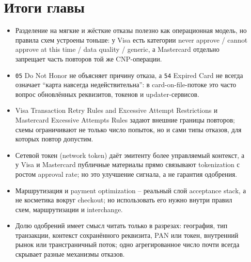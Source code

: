 \section*{Итоги главы}
\begin{itemize}
  \item Разделение на мягкие и жёсткие отказы полезно как операционная
        модель, но правила схем устроены тоньше: у Visa есть
        категории never approve / cannot approve at this time / data
        quality / generic, а Mastercard отдельно запрещает часть
        повторов той же CNP-операции.
  \item \texttt{05} Do Not Honor не объясняет причину отказа, а \texttt{54}
        Expired Card не всегда означает \enquote{карта навсегда
        недействительна}: в card-on-file-потоке это часто вопрос
        обновлённых реквизитов, токенов и updater-сервисов.
  \item Visa Transaction Retry Rules and Excessive Attempt Restrictions
        и Mastercard Excessive Attempts Rules задают внешние границы
        повторов; схемы ограничивают не только число попыток, но и сами
        типы отказов, для которых повтор допустим.
  \item Сетевой токен (network token) даёт эмитенту более управляемый
        контекст, а у Visa и Mastercard публичные
        материалы прямо связывают tokenization с ростом approval rate;
        но это улучшение сигнала, а не гарантия одобрения.
  \item Маршрутизация и payment optimization -- реальный слой acceptance
        stack, а не косметика вокруг checkout; но использовать его
        нужно внутри правил схем, маршрутизации и interchange.
  \item Долю одобрений имеет смысл читать только в разрезах:
        география, тип транзакции, контекст сохранённого реквизита, PAN или
        токен, внутренний рынок или трансграничный поток; одно
        агрегированное число почти всегда скрывает разные механизмы
        отказов.
\end{itemize}
